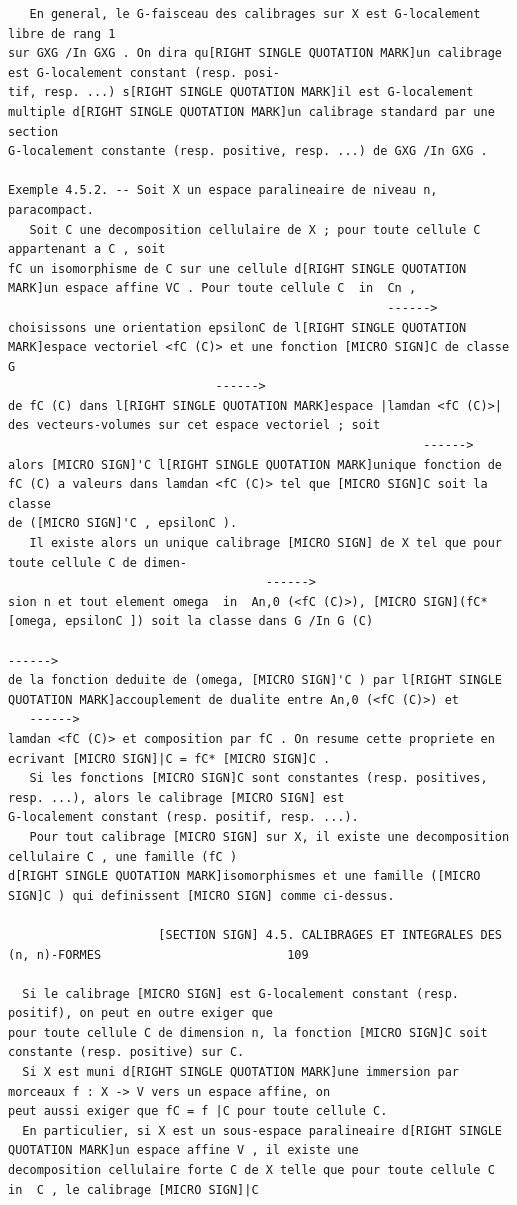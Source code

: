 \documentclass[
  11pt,
]{article}
\begin{document}
\begin{lstlisting}
   En general, le G-faisceau des calibrages sur X est G-localement libre de rang 1
sur GXG /In GXG . On dira qu[RIGHT SINGLE QUOTATION MARK]un calibrage est G-localement constant (resp. posi-
tif, resp. ...) s[RIGHT SINGLE QUOTATION MARK]il est G-localement multiple d[RIGHT SINGLE QUOTATION MARK]un calibrage standard par une section
G-localement constante (resp. positive, resp. ...) de GXG /In GXG .

Exemple 4.5.2. -- Soit X un espace paralineaire de niveau n, paracompact.
   Soit C une decomposition cellulaire de X ; pour toute cellule C appartenant a C , soit
fC un isomorphisme de C sur une cellule d[RIGHT SINGLE QUOTATION MARK]un espace affine VC . Pour toute cellule C  in  Cn ,
                                                     ------>
choisissons une orientation epsilonC de l[RIGHT SINGLE QUOTATION MARK]espace vectoriel <fC (C)> et une fonction [MICRO SIGN]C de classe G
                             ------>
de fC (C) dans l[RIGHT SINGLE QUOTATION MARK]espace |lamdan <fC (C)>| des vecteurs-volumes sur cet espace vectoriel ; soit
                                                          ------>
alors [MICRO SIGN]'C l[RIGHT SINGLE QUOTATION MARK]unique fonction de fC (C) a valeurs dans lamdan <fC (C)> tel que [MICRO SIGN]C soit la classe
de ([MICRO SIGN]'C , epsilonC ).
   Il existe alors un unique calibrage [MICRO SIGN] de X tel que pour toute cellule C de dimen-
                                    ------>
sion n et tout element omega  in  An,0 (<fC (C)>), [MICRO SIGN](fC* [omega, epsilonC ]) soit la classe dans G /In G (C)
                                                                                  ------>
de la fonction deduite de (omega, [MICRO SIGN]'C ) par l[RIGHT SINGLE QUOTATION MARK]accouplement de dualite entre An,0 (<fC (C)>) et
   ------>
lamdan <fC (C)> et composition par fC . On resume cette propriete en ecrivant [MICRO SIGN]|C = fC* [MICRO SIGN]C .
   Si les fonctions [MICRO SIGN]C sont constantes (resp. positives, resp. ...), alors le calibrage [MICRO SIGN] est
G-localement constant (resp. positif, resp. ...).
   Pour tout calibrage [MICRO SIGN] sur X, il existe une decomposition cellulaire C , une famille (fC )
d[RIGHT SINGLE QUOTATION MARK]isomorphismes et une famille ([MICRO SIGN]C ) qui definissent [MICRO SIGN] comme ci-dessus.

                     [SECTION SIGN] 4.5. CALIBRAGES ET INTEGRALES DES (n, n)-FORMES                          109

  Si le calibrage [MICRO SIGN] est G-localement constant (resp. positif), on peut en outre exiger que
pour toute cellule C de dimension n, la fonction [MICRO SIGN]C soit constante (resp. positive) sur C.
  Si X est muni d[RIGHT SINGLE QUOTATION MARK]une immersion par morceaux f : X -> V vers un espace affine, on
peut aussi exiger que fC = f |C pour toute cellule C.
  En particulier, si X est un sous-espace paralineaire d[RIGHT SINGLE QUOTATION MARK]un espace affine V , il existe une
decomposition cellulaire forte C de X telle que pour toute cellule C  in  C , le calibrage [MICRO SIGN]|C
\end{lstlisting}
\end{document}
